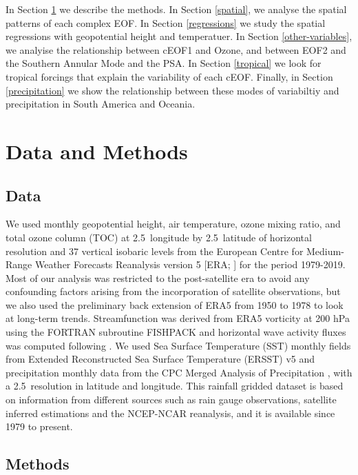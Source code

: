 \documentclass[smallextended]{svjour3}       %
\begin{document}
In Section \ref{methods} we describe the methods.
In Section \ref{spatial}, we analyse the spatial patterns of each complex EOF.
In Section \ref{regressions} we study the spatial regressions with geopotential height and temperatuer.
In Section \ref{other-variables}, we analyise the relationship between cEOF1 and Ozone, and between EOF2 and the Southern Annular Mode and the PSA.
In Section \ref{tropical} we look for tropical forcings that explain the variability of each cEOF.
Finally, in Section \ref{precipitation} we show the relationship between these modes of variabiltiy and precipitation in South America and Oceania.

\hypertarget{methods}{%
\section{Data and Methods}\label{methods}}

\hypertarget{data}{%
\subsection{Data}\label{data}}

We used monthly geopotential height, air temperature, ozone mixing ratio, and total ozone column (TOC) at 2.5\degree~longitude by 2.5\degree~latitude of horizontal resolution and 37 vertical isobaric levels from the European Centre for Medium-Range Weather Forecasts Reanalysis version 5 {[}ERA; \citet{era5}{]} for the period 1979-2019. Most of our analysis was restricted to the post-satellite era to avoid any confounding factors arising from the incorporation of satellite observations, but we also used the preliminary back extension of ERA5 from 1950 to 1978 \citep{era5be} to look at long-term trends. Streamfunction was derived from ERA5 vorticity at 200 hPa using the FORTRAN subroutine FISHPACK \citep{fishpack} and horizontal wave activity fluxes was computed following \citet{plumb1985}. We used Sea Surface Temperature (SST) monthly fields from Extended Reconstructed Sea Surface Temperature (ERSST) v5 \citep{huang2017} and precipitation monthly data from the CPC Merged Analysis of Precipitation \citep{cmap}, with a 2.5\degree~resolution in latitude and longitude.
This rainfall gridded dataset is based on information from different sources such as rain gauge observations, satellite inferred estimations and the NCEP-NCAR reanalysis, and it is available since 1979 to present.

\hypertarget{methods-1}{%
\subsection{Methods}\label{methods-1}}
\end{document}
